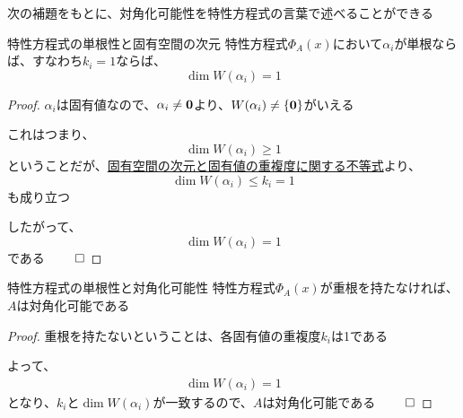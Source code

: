 \documentclass[../../../topic_linear-algebra]{subfiles}
\begin{document}
\sectionline

次の補題をもとに、対角化可能性を特性方程式の言葉で述べることができる

\begin{theorem}{特性方程式の単根性と固有空間の次元}
  特性方程式$\Phi_A(x)$において$\alpha_i$が単根ならば、すなわち$k_i = 1$ならば、
  \begin{equation*}
    \dim W(\alpha_i) = 1
  \end{equation*}
\end{theorem}

\begin{proof}
  $\alpha_i$は固有値なので、$\alpha_i \neq \vb*{0}$より、$W(\alpha_i) \neq \{\vb*{0}\}$がいえる

  これはつまり、
  \begin{equation*}
    \dim W(\alpha_i) \geq 1
  \end{equation*}
  ということだが、\hyperref[thm:geom-mult-leq-alg-mult]{固有空間の次元と固有値の重複度に関する不等式}より、
  \begin{equation*}
    \dim W(\alpha_i) \leq k_i = 1
  \end{equation*}
  も成り立つ

  したがって、
  \begin{equation*}
    \dim W(\alpha_i) = 1
  \end{equation*}
  である $\qed$
\end{proof}

\br

\begin{theorem}{特性方程式の単根性と対角化可能性}
  特性方程式$\Phi_A(x)$が重根を持たなければ、$A$は対角化可能である
\end{theorem}

\begin{proof}
  重根を持たないということは、各固有値の重複度$k_i$は1である

  よって、
  \begin{gather*}
    \dim W(\alpha_i) = 1
  \end{gather*}
  となり、$k_i$と$\dim W(\alpha_i)$が一致するので、$A$は対角化可能である  $\qed$
\end{proof}
\end{document}
